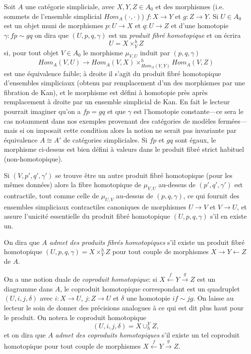 \documentclass[12pt]{article}
\begin{document}
Soit $A$ une cat\'egorie simpliciale, avec $X,Y,Z\in A_0$ et des
morphismes (i.e. sommets de l'ensemble simplicial $Hom _A(\cdot , \cdot )$)
$f: X\rightarrow Y$ et $g: Z\rightarrow Y$. Si $U\in A_0$ est un objet
muni de morphismes $p: U\rightarrow X$ et $q: U\rightarrow Z$ et d'une homotopie
$\gamma : fp\sim gq$ on dira que $(U,p,q,\gamma )$ est un {\em produit fibr\'e
homotopique} et on \'ecrira
$$
U= X\times ^h_YZ
$$
si, pour tout objet $V\in A_0$ le morphisme $\mu _{V,U}$ induit par $(p,q,
\gamma )$
$$
Hom _A(V,U)\rightarrow Hom _A(V,X)\times ^h_{Hom _A(V,Y)}Hom _A(V,Z)
$$
est une \'equivalence faible; \`a droite il s'agit du produit fibr\'e
homotopique d'ensembles simpliciaux (obtenu par remplacement d'un des morphismes
par une fibration de Kan), et le morphisme est d\'efini \`a homotopie pr\`es
apr\`es remplacement \`a droite par un ensemble simplicial de Kan. En fait
le lecteur pourrait imaginer qu'on a $fp=gq$ et que $\gamma$ est l'homotopie
constante---ce sera le cas notamment dans nos exemples provenant des
cat\'egories
de mod\`eles ferm\'ees---mais si on imposait cette condition alors
la notion ne serait pas invariante par \'equivalence $A\cong A'$ de
cat\'egories simpliciales. Si
$fp$ et $gq$ sont \'egaux, le morphisme ci-dessus est bien d\'efini
\`a valeurs dans le produit fibr\'e strict habituel (non-homotopique).

 Si $(V, p',q',\gamma ')$ se trouve \^etre un autre  produit fibr\'e homotopique
(pour les m\^emes donn\'ees)
alors la fibre homotopique de $\mu _{V,U}$  au-dessus de $(p',q',\gamma ')$ est
contractile, tout comme celle de $\mu _{U,V}$
au-dessus de $(p,q,\gamma)$, ce qui
fournit des ensembles
simpliciaux contractiles canoniques de morphismes $U\rightarrow V$ et
$V\rightarrow U$, et assure l'unicit\'e essentielle du produit fibr\'e
homotopique $(U,p,q,\gamma )$ s'il en existe un.

On dira que {\em $A$ admet des produits fibr\'es homotopiques} s'il
existe un
produit fibr\'e homotopique $(U,p,q,\gamma )= X\times ^h_YZ$ pour tout
couple de morphismes $X\rightarrow Y\leftarrow Z$ de $A$.

On a une notion duale de {\em coproduit homotopique}: si
$X\stackrel{f}{\leftarrow} Y\stackrel{g}{\rightarrow} Z$ est un
diagramme dans
$A$, le coproduit homotopique correspondant est un
quadruplet$(U, i,j,\delta )$ avec $i: X\rightarrow U$,
$j: Z\rightarrow U$ et $\delta$ une homotopie $if\sim jg$. On laisse au lecteur
le soin de donner des pr\'ecisions analogues \`a ce qui est dit plus
haut pour le produit.
On notera le coproduit homotopique
$$
(U,i,j,\delta ) = X\cup _h^YZ,
$$
et on dira que $A$ {\em admet des coproduits homotopiques} s'il existe
un tel coproduit
homotopique pour tout couple de morphismes
$X\stackrel{f}{\leftarrow} Y\stackrel{g}{\rightarrow} Z$.
\end{document}
